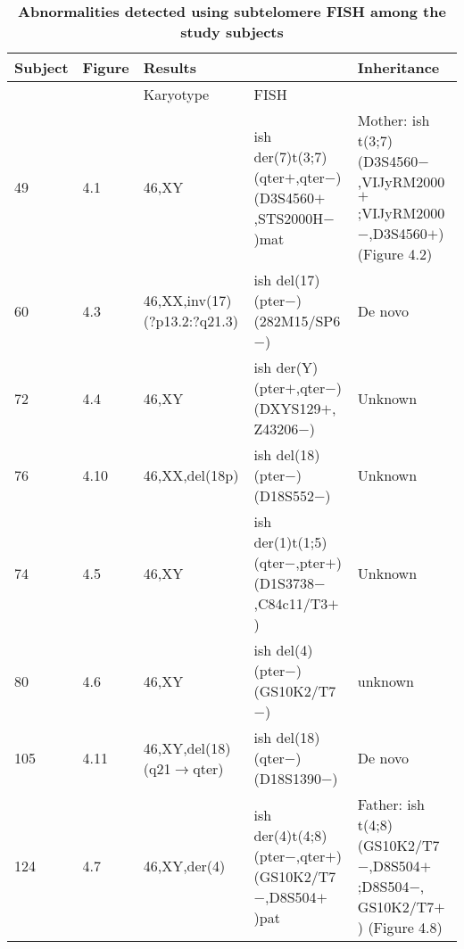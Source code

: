 \begin{table}
\begin{tabular}{ | l  l  l  l  l | }
\caption{\textbf{Abnormalities detected using subtelomere FISH among the study subjects}}\\
\hline
	Subject & Figure & Results                             &                                                              & Inheritance                                                                        \\ \hline
          &        & Karyotype                           & FISH                                                         &                                                                                    \\ \hline
	49      & 4.1    & 46,XY                               & ish der(7)t(3;7)(qter$+$,qter$-$)(D3S4560$+$,STS2000H$-$)mat & Mother: ish t(3;7)(D3S4560$-$,VIJyRM2000$+$;VIJyRM2000$-$,D3S4560$+$) (Figure 4.2) \\ \hline
	60      & 4.3    & 46,XX,inv(17)(?p13.2:?q21.3)        & ish del(17)(pter$-$)(282M15/SP6$-$)                          & De novo                                                                            \\ \hline
	72      & 4.4    & 46,XY                               & ish der(Y)(pter$+$,qter$-$)(DXYS129$+$, Z43206$-$)           & Unknown                                                                            \\ \hline
	76      & 4.10   & 46,XX,del(18p)                      & ish del(18)(pter$-$)(D18S552$-$)                             & Unknown                                                                            \\ \hline
	74      & 4.5    & 46,XY                               & ish der(1)t(1;5)(qter$-$,pter$+$)(D1S3738$-$,C84c11/T3$+$)   & Unknown                                                                            \\ \hline
	80      & 4.6    & 46,XY                               & ish del(4)(pter$-$)(GS10K2/T7$-$)                            & unknown                                                                            \\ \hline
	105     & 4.11   & 46,XY,del(18)(q21$\rightarrow$qter) & ish del(18)(qter$-$)(D18S1390$-$)                            & De novo                                                                            \\ \hline
	124     & 4.7    & 46,XY,der(4)                        & ish der(4)t(4;8)(pter$-$,qter$+$)(GS10K2/T7$-$,D8S504$+$)pat & Father: ish t(4;8)(GS10K2/T7$-$,D8S504$+$;D8S504$-$, GS10K2/T7$+$) (Figure 4.8)    \\ \hline

\end{tabular}
\end{table}
